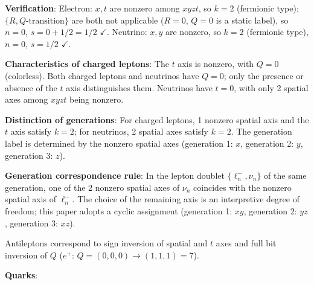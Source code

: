 \documentclass[
  a4paper,11pt]{article}
\theoremstyle{definition}
\theoremstyle{remark}
\begin{document}
\textbf{Verification}: Electron: \(x, t\) are nonzero among \(xyzt\), so
\(k = 2\) (fermionic type); \(\{R, Q\text{-transition}\}\) are both not
applicable (\(R = 0\), \(Q = 0\) is a static label), so \(n = 0\),
\(s = 0 + 1/2 = 1/2\) \(\checkmark\). Neutrino: \(x, y\) are nonzero, so
\(k = 2\) (fermionic type), \(n = 0\), \(s = 1/2\) \(\checkmark\).

\textbf{Characteristics of charged leptons}: The \(t\) axis is nonzero,
with \(Q = 0\) (colorless). Both charged leptons and neutrinos have
\(Q = 0\); only the presence or absence of the \(t\) axis distinguishes
them. Neutrinos have \(t = 0\), with only 2 spatial axes among \(xyzt\)
being nonzero.

\textbf{Distinction of generations}: For charged leptons, 1 nonzero
spatial axis and the \(t\) axis satisfy \(k = 2\); for neutrinos, 2
spatial axes satisfy \(k = 2\). The generation label is determined by
the nonzero spatial axes (generation 1: \(x\), generation 2: \(y\),
generation 3: \(z\)).

\textbf{Generation correspondence rule}: In the lepton doublet
\(\{\ell^-_n, \nu_n\}\) of the same generation, one of the 2 nonzero
spatial axes of \(\nu_n\) coincides with the nonzero spatial axis of
\(\ell^-_n\). The choice of the remaining axis is an interpretive degree
of freedom; this paper adopts a cyclic assignment (generation 1: \(xy\),
generation 2: \(yz\), generation 3: \(xz\)).

Antileptons correspond to sign inversion of spatial and \(t\) axes and
full bit inversion of \(Q\) (\(e^+\): \(Q = (0,0,0) \to (1,1,1) = 7\)).

\textbf{Quarks}:
\end{document}
